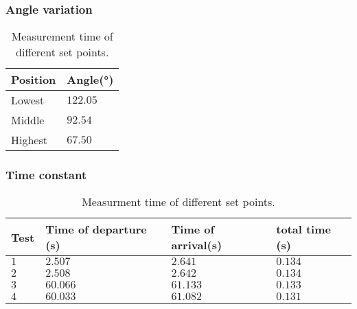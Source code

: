 		\subsubsection*{Angle variation}


\begin{table}[htbp]
	\centering
	\caption{Measurement time of different set points.}
	\label{tab:AngleData}
	\begin{tabularx}{\textwidth}{lX} 
		Position & Angle{(}°{)}  \\ \toprule
		Lowest & $122.05$  \\ \rowcolor{lightGrey}
		Middle & $92.54$  \\ 
		Highest & $67.50$  \\
	\end{tabularx}
\end{table}
		
		
		
	
		\subsubsection*{Time constant}

\begin{table}[htbp]
	\centering
	\caption{Measurment time of different set points.}
	\label{tab:TimeData}
	\begin{tabularx}{\textwidth}{lXXX} 
		Test & Time of departure {(}s{)}& Time of arrival{(}s{)} & total time {(}s{)} \\  \toprule 
		$1$     & $2.507$              & $2.641$             & $0.134$                     \\   \rowcolor{lightGrey}
		$2$     & $2.508$              & $2.642$ & $0.134$                                 \\
		$3$     & $60.066$              & $61.133$ & $0.133$                                 \\ \rowcolor{lightGrey}
		$4$     & $60.033$             & $61.082$            & $0.131$                    \\ 
	\end{tabularx}
\end{table}
				

